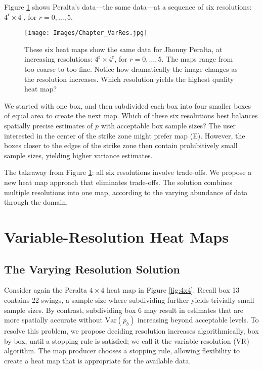 Figure \ref{fig:6res} shows Peralta's data---the same data---at a sequence of six resolutions: $4^{\text{r}}\times 4 ^{\text{r}}$, for $r = 0, \dots, 5$.
        \begin{figure}[H]
      	\centering
      	\texttt{[image: Images/Chapter\_VarRes.jpg]} 
      	\caption{These six heat maps show the same data for Jhonny Peralta, at increasing resolutions: $4^{\text{r}}\times 4 ^{\text{r}}$, for $r = 0, \dots, 5$. The maps range from too coarse to too fine. Notice how dramatically the image changes as the resolution increases. Which resolution yields the highest quality heat map?}
      	\label{fig:6res}
      	\end{figure} 
We started with one box, and then subdivided each box into four smaller boxes of equal area to create the next map. Which of these six resolutions best balances spatially precise estimates of $p$ with acceptable box sample sizes? The user interested in the center of the strike zone might prefer map (E). However, the boxes closer to the edges of the strike zone then contain prohibitively small sample sizes, yielding higher variance estimates. 

The takeaway from Figure \ref{fig:6res}: all six resolutions involve trade-offs. We propose a new heat map approach that eliminates trade-offs. The solution combines multiple resolutions into one map, according to the varying abundance of data through the domain.

\section{Variable-Resolution Heat Maps} \label{VRHM}

\subsection{The Varying Resolution Solution}

Consider again the Peralta $4 \times 4$ heat map in Figure \ref{fig:4x4}. Recall box 13 contains 22 swings, a sample size where subdividing further yields trivially small sample sizes. By contrast, subdividing box 6 may result in estimates that are more spatially accurate without $\text{Var}(p_{b})$ increasing beyond acceptable levels. To resolve this problem, we propose deciding resolution increases algorithmically, box by box, until a stopping rule is satisfied; we call it the variable-resolution (VR) algorithm. The map producer chooses a stopping rule, allowing flexibility to create a heat map that is appropriate for the available data. 

